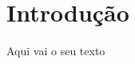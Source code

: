 \documentclass[
	12pt,				%
	oneside,			%
	a4paper,			%
	chapter=TITLE,		%
	english,			%
	brazil,				%
	]{custom-unisagrado}
\begin{document}

\frenchspacing


\imprimircapa


\imprimirfolhaderosto



\begin{comment}
\pdfbookmark[0]{\listfigurename}{lof}
\listoffigures*
\cleardoublepage
\end{comment}


\begin{comment}
\pdfbookmark[0]{\listtablename}{lot}
\listoftables*
\cleardoublepage
\end{comment}


\begin{comment}
\pdfbookmark[0]{\contentsname}{toc}
\tableofcontents*
\cleardoublepage
\end{comment}

\textual

\chapter{Introdução}

Aqui vai o seu texto
\end{document}
